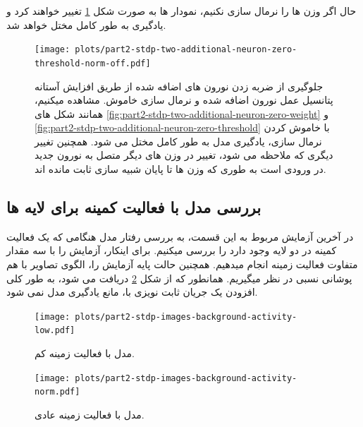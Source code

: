         حال اگر وزن ها را نرمال سازی نکنیم، نمودار ها به صورت شکل 
        \ref{fig:part2-stdp-two-additional-neuron-zero-threshold-norm-off}
        تغییر خواهند کرد و یادگیری به طور کامل مختل خواهد شد.
        \begin{figure}[H]
            \centering
            \texttt{[image: plots/part2-stdp-two-additional-neuron-zero-threshold-norm-off.pdf]} 
            \caption{
                جلوگیری از ضربه زدن نورون های اضافه شده از طریق افزایش آستانه پتانسیل عمل نورون اضافه شده و نرمال سازی خاموش. مشاهده میکنیم، همانند شکل های 
                \ref{fig:part2-stdp-two-additional-neuron-zero-weight} 
                و 
                \ref{fig:part2-stdp-two-additional-neuron-zero-threshold} 
                با خاموش کردن نرمال سازی، یادگیری مدل به طور کامل مختل می شود. همچنین تغییر دیگری که ملاحظه می شود، تغییر در وزن های دیگر متصل به نورون جدید در ورودی است به طوری که وزن ها تا پایان شبیه سازی ثابت مانده اند.
            }
            \label{fig:part2-stdp-two-additional-neuron-zero-threshold-norm-off}
        \end{figure}

        \subsection{بررسی مدل با فعالیت کمینه برای لایه ها}
        در آخرین آزمایش مربوط به این قسمت، به بررسی رفتار مدل هنگامی که یک فعالیت کمینه در دو لایه وجود دارد را بررسی میکنیم. برای اینکار، آزمایش را با سه مقدار متفاوت فعالیت زمینه انجام میدهیم. همچنین حالت پایه آزمایش را، الگوی تصاویر با هم پوشانی نسبی در نظر میگیریم.
        همانطور که از شکل
        \ref{fig:part2-stdp-images-background-activity-low}
        دریافت می شود، به طور کلی افزودن یک جریان ثابت نویزی با، مانع یادگیری مدل نمی شود. 

        \begin{figure}[!ht]
            \centering
            \texttt{[image: plots/part2-stdp-images-background-activity-low.pdf]} 
            \caption{مدل با فعالیت زمینه کم.}
            \label{fig:part2-stdp-images-background-activity-low}
        \end{figure}
        \begin{figure}[!ht]
            \centering
            \texttt{[image: plots/part2-stdp-images-background-activity-norm.pdf]}
            \caption{مدل با فعالیت زمینه عادی.}
            \label{fig:part2-stdp-images-background-activity-norm}
        \end{figure}

